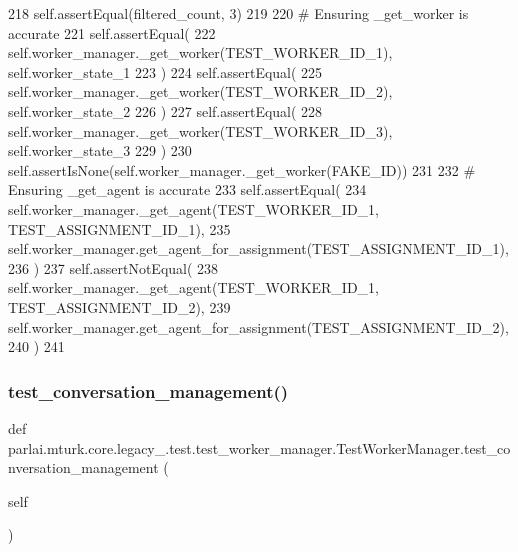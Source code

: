 \begin{DoxyCode}
218         self.assertEqual(filtered\_count, 3)
219 
220         \textcolor{comment}{# Ensuring \_get\_worker is accurate}
221         self.assertEqual(
222             self.worker\_manager.\_get\_worker(TEST\_WORKER\_ID\_1), self.worker\_state\_1
223         )
224         self.assertEqual(
225             self.worker\_manager.\_get\_worker(TEST\_WORKER\_ID\_2), self.worker\_state\_2
226         )
227         self.assertEqual(
228             self.worker\_manager.\_get\_worker(TEST\_WORKER\_ID\_3), self.worker\_state\_3
229         )
230         self.assertIsNone(self.worker\_manager.\_get\_worker(FAKE\_ID))
231 
232         \textcolor{comment}{# Ensuring \_get\_agent is accurate}
233         self.assertEqual(
234             self.worker\_manager.\_get\_agent(TEST\_WORKER\_ID\_1, TEST\_ASSIGNMENT\_ID\_1),
235             self.worker\_manager.get\_agent\_for\_assignment(TEST\_ASSIGNMENT\_ID\_1),
236         )
237         self.assertNotEqual(
238             self.worker\_manager.\_get\_agent(TEST\_WORKER\_ID\_1, TEST\_ASSIGNMENT\_ID\_2),
239             self.worker\_manager.get\_agent\_for\_assignment(TEST\_ASSIGNMENT\_ID\_2),
240         )
241 
\end{DoxyCode}
\mbox{\label{classparlai_1_1mturk_1_1core_1_1legacy__2018_1_1test_1_1test__worker__manager_1_1TestWorkerManager_a9182a7034c635a303990a6c90635ef26}} 
\subsubsection{\texorpdfstring{test\+\_\+conversation\+\_\+management()}{test\_conversation\_management()}}
{\footnotesize\ttfamily def parlai.\+mturk.\+core.\+legacy\+\_.\+test.\+test\+\_\+worker\+\_\+manager.\+Test\+Worker\+Manager.\+test\+\_\+conversation\+\_\+management (\begin{DoxyParamCaption}\item[{}]{self }\end{DoxyParamCaption})}

